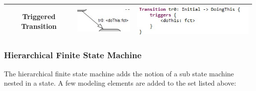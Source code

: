 \begin{table}
\begin{tabular}{|c|c|c|}
 Triggered Transition & \includegraphics[scale=0.7]{images/040-TriggeredTransition.jpg} & 
\includegraphics[scale=0.5]{images/040-TriggeredTransitionTextual.jpg} \\ \hline
\end{tabular}
\end{table}


\subsubsection{Hierarchical Finite State Machine}

The hierarchical finite state machine adds the notion of a sub state machine nested in a state.
A few modeling elements are added to the set listed above:

